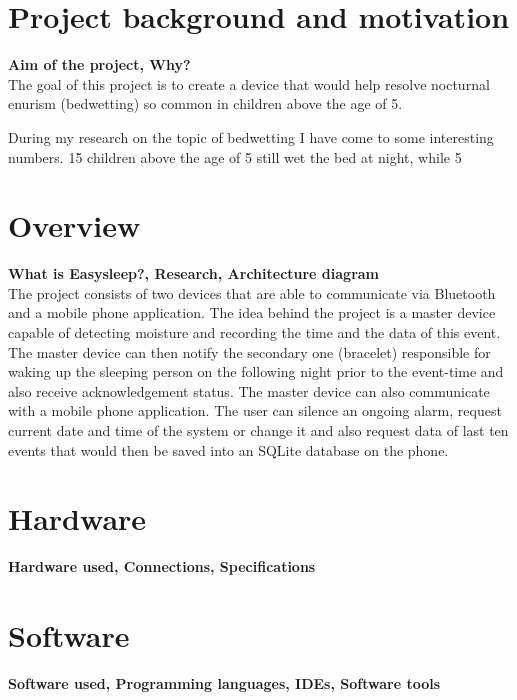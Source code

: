 \documentclass[12pt,a4paper]{article}
\begin{document}
	\section{Project background and motivation}
	{\bfseries Aim of the project, Why?}\\
	
	The goal of this project is to create a device that would help resolve nocturnal enurism (bedwetting) so common in children above the age of 5. 
	
	During my research on the topic of bedwetting I have come to some interesting numbers. 15%
	children above the age of 5 still wet the bed at night, while 5%
	\newpage
	
	\section{Overview}
	{\bfseries What is Easysleep?, Research, Architecture diagram}\\
	
	The project consists of two devices 
	that are able to communicate via Bluetooth and a mobile phone application. The idea behind
	the project is a master device capable of detecting moisture and recording the time and the 
	data of this event. The master device can then notify the secondary one (bracelet) responsible for waking up the sleeping person on the following night prior to the event-time and also receive acknowledgement status. The master device can also communicate with a mobile phone application.  
	The user can silence an ongoing alarm, request current date and time of the system or change it  
	and also request data of last ten events that would then be saved into an SQLite database on  
	the phone. \\

	\newpage
	
	\section{Hardware}
	{\bfseries Hardware used, Connections, Specifications}\\
	\newpage
	
	\section{Software}
	{\bfseries Software used, Programming languages, IDEs, Software tools}\\
	
\end{document}
